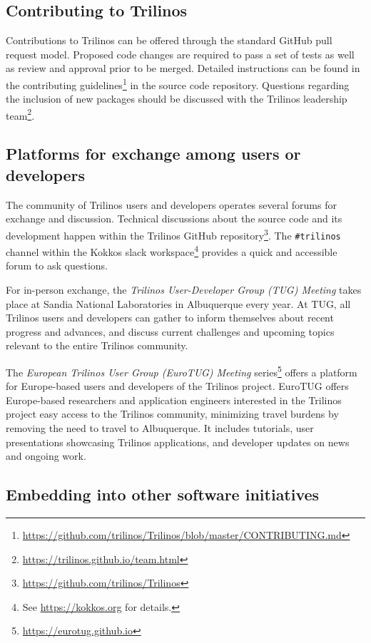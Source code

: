 
\subsection{Contributing to Trilinos}

Contributions to Trilinos can be offered through the standard GitHub pull request model. Proposed code changes are required to pass a set of tests as well as review and approval prior to be merged. Detailed instructions can be found in the contributing guidelines\footnote{\url{https://github.com/trilinos/Trilinos/blob/master/CONTRIBUTING.md}} in the source code repository.
Questions regarding the inclusion of new packages should be discussed with the Trilinos leadership team\footnote{\url{https://trilinos.github.io/team.html}}.

\subsection{Platforms for exchange among users or developers}

The community of Trilinos users and developers operates several forums for exchange and discussion. Technical discussions about the source code and its development happen within the Trilinos GitHub repository\footnote{\url{https://github.com/trilinos/Trilinos}}.
The \texttt{\#trilinos} channel within the Kokkos slack workspace\footnote{See \url{https://kokkos.org} for details.} provides a quick and accessible forum to ask questions.

For in-person exchange, the \emph{Trilinos User-Developer Group (TUG) Meeting} takes place at Sandia National Laboratories in Albuquerque every year. At TUG, all Trilinos users and developers can gather to inform themselves about recent progress and advances, and discuss current challenges and upcoming topics relevant to the entire Trilinos community.

The \emph{European Trilinos User Group (EuroTUG) Meeting} series\footnote{\url{https://eurotug.github.io}}
offers a platform for Europe-based users and developers of the Trilinos project.
EuroTUG offers Europe-based researchers and application engineers interested in the Trilinos project easy access to the Trilinos community, minimizing travel burdens by removing the need to travel to Albuquerque.
It includes tutorials, user presentations showcasing Trilinos applications, and developer updates on news and ongoing work.

\subsection{Embedding into other software initiatives}

